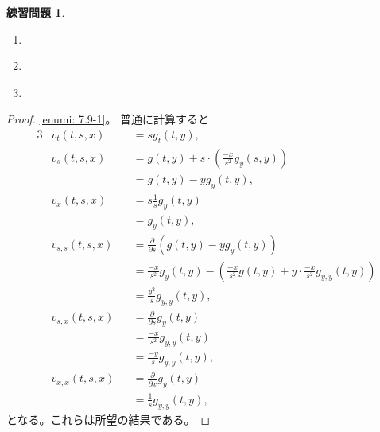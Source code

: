 \documentclass[uplatex]{jsarticle}
\theoremstyle{definition}
\newtheorem{prob}[prob]{練習問題}
\begin{document}
\begin{prob}\label{prob: 7.9}
  \begin{enumerate}
    \item \label{enumi: 7.9-1}
    \item \label{enumi: 7.9-2}
    \item \label{enumi: 7.9-3}
  \end{enumerate}
\end{prob}

\begin{proof}
  \ref{enumi: 7.9-1}。
  普通に計算すると
  \begin{alignat*}{3}
    &v_t(t,s,x) & &= sg_t(t,y), \\
    &v_s(t,s,x) & &= g(t,y) + s \cdot \left(\frac{-x}{s^2}g_y(s,y)\right) \\
    & & &= g(t,y) - yg_y(t,y), \\
    &v_x(t,s,x) & &= s\frac{1}{s}g_y(t,y) \\
    & & &= g_y(t,y), \\
    &v_{s,s}(t,s,x) &
    &= \frac{\partial}{\partial s}\left( g(t,y) - yg_y(t,y) \right)\\
    & & &= \frac{-x}{s^2}g_y(t,y) -
    \left( \frac{-x}{s^2}g(t,y) + y\cdot \frac{-x}{s^2}g_{y,y}(t,y)\right) \\
    & & &= \frac{y^2}{s}g_{y,y}(t,y), \\
    &v_{s,x}(t,s,x) & &= \frac{\partial}{\partial s}g_y(t,y) \\
    & & &= \frac{-x}{s^2}g_{y,y}(t,y) \\
    & & &= \frac{-y}{s}g_{y,y}(t,y), \\
    &v_{x,x}(t,s,x) & &= \frac{\partial}{\partial x}g_y(t,y) \\
    & & &= \frac{1}{s}g_{y,y}(t,y),
  \end{alignat*}
  となる。これらは所望の結果である。


\end{proof}
\end{document}
